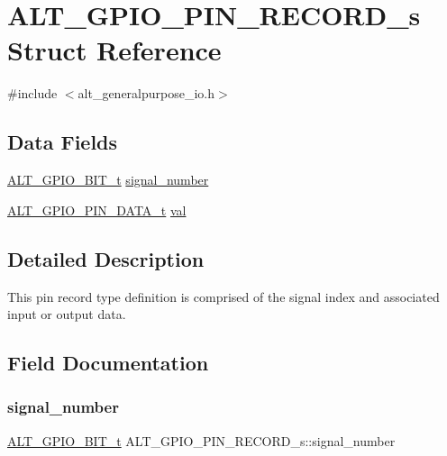 \hypertarget{structALT__GPIO__PIN__RECORD__s}{}\section{A\+L\+T\+\_\+\+G\+P\+I\+O\+\_\+\+P\+I\+N\+\_\+\+R\+E\+C\+O\+R\+D\+\_\+s Struct Reference}
\label{structALT__GPIO__PIN__RECORD__s}


{\ttfamily \#include $<$alt\+\_\+generalpurpose\+\_\+io.\+h$>$}

\subsection*{Data Fields}
\begin{DoxyCompactItemize}
\item 
\mbox{\hyperlink{group__ALT__GPIO__BITVIEW_ga6d149a5961bef8b91b8108e3838b1e09}{A\+L\+T\+\_\+\+G\+P\+I\+O\+\_\+B\+I\+T\+\_\+t}} \mbox{\hyperlink{structALT__GPIO__PIN__RECORD__s_a4f78882602159eb55bc954fd977eb74f}{signal\+\_\+number}}
\item 
\mbox{\hyperlink{group__ALT__GPIO__API__CONFIG_ga757cd8797c8bb2ed86d75d961ce9041b}{A\+L\+T\+\_\+\+G\+P\+I\+O\+\_\+\+P\+I\+N\+\_\+\+D\+A\+T\+A\+\_\+t}} \mbox{\hyperlink{structALT__GPIO__PIN__RECORD__s_ab2a16995759994ff9b5c25de0af55627}{val}}
\end{DoxyCompactItemize}


\subsection{Detailed Description}
This pin record type definition is comprised of the signal index and associated input or output data. 

\subsection{Field Documentation}
\mbox{\label{structALT__GPIO__PIN__RECORD__s_a4f78882602159eb55bc954fd977eb74f}} 
\subsubsection{\texorpdfstring{signal\_number}{signal\_number}}
{\footnotesize\ttfamily \mbox{\hyperlink{group__ALT__GPIO__BITVIEW_ga6d149a5961bef8b91b8108e3838b1e09}{A\+L\+T\+\_\+\+G\+P\+I\+O\+\_\+B\+I\+T\+\_\+t}} A\+L\+T\+\_\+\+G\+P\+I\+O\+\_\+\+P\+I\+N\+\_\+\+R\+E\+C\+O\+R\+D\+\_\+s\+::signal\+\_\+number}

